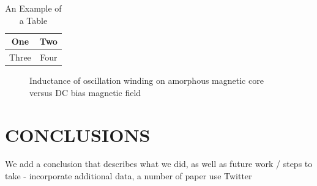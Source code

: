 \documentclass[letterpaper, 12 pt, conference]{ieeeconf}  %
\begin{document}
\begin{table}[h]
\caption{An Example of a Table}
\label{table_example}
\begin{center}
\begin{tabular}{|c||c|}
\hline
One & Two\\
\hline
Three & Four\\
\hline
\end{tabular}
\end{center}
\end{table}


   \begin{figure}[thpb]
      \centering
      \caption{Inductance of oscillation winding on amorphous
       magnetic core versus DC bias magnetic field}
      \label{figurelabel}
   \end{figure}

\section{CONCLUSIONS}

We add a conclusion that describes what we did, as well as future work / steps to take
- incorporate additional data, a number of paper use Twitter

\addtolength{\textheight}{-12cm}   %







\end{document}
